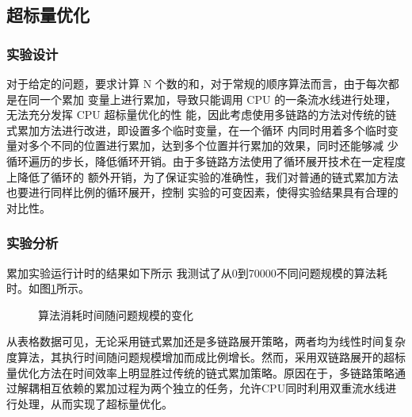 \documentclass[a4paper]{article}
\begin{document}
    \subsection{超标量优化}
      \subsubsection{实验设计}
对于给定的问题，要求计算 N 个数的和，对于常规的顺序算法而言，由于每次都是在同一个累加
变量上进行累加，导致只能调用 CPU 的一条流水线进行处理，无法充分发挥 CPU 超标量优化的性
能，因此考虑使用多链路的方法对传统的链式累加方法进行改进，即设置多个临时变量，在一个循环
内同时用着多个临时变量对多个不同的位置进行累加，达到多个位置并行累加的效果，同时还能够减
少循环遍历的步长，降低循环开销。由于多链路方法使用了循环展开技术在一定程度上降低了循环的
额外开销，为了保证实验的准确性，我们对普通的链式累加方法也要进行同样比例的循环展开，控制
实验的可变因素，使得实验结果具有合理的对比性。
      \subsubsection{实验分析}
累加实验运行计时的结果如下所示
我测试了从0到70000不同问题规模的算法耗时。如图\ref{fig:all2}所示。

               \begin{figure}[!htbp]
                    \centering
                    \centering
                    \caption{算法消耗时间随问题规模的变化}
                    \label{fig:sum2}
                    \label{fig:all2}
                \end{figure}
从表格数据可见，无论采用链式累加还是多链路展开策略，两者均为线性时间复杂度算法，其执行时间随问题规模增加而成比例增长。然而，采用双链路展开的超标量优化方法在时间效率上明显胜过传统的链式累加策略。原因在于，多链路策略通过解耦相互依赖的累加过程为两个独立的任务，允许CPU同时利用双重流水线进行处理，从而实现了超标量优化。
\end{document}
